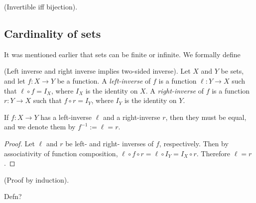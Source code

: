 \begin{theorem}
\label{ch::logic_pf_fns::thm::invertible_iff_bijection}
    (Invertible iff bijection).
\end{theorem}

\subsection*{Cardinality of sets}

It was mentioned earlier that sets can be finite or infinite. We formally define

\begin{theorem}
    (Left inverse and right inverse implies two-sided inverse). Let $X$ and $Y$ be sets, and let $f:X \rightarrow Y$ be a function. A \textit{left-inverse} of $f$ is a function $\ell:Y \rightarrow X$ such that $\ell \circ f = I_X$, where $I_X$ is the identity on $X$. A \textit{right-inverse} of $f$ is a function $r:Y \rightarrow X$ such that $f \circ r = I_Y$, where $I_Y$ is the identity on $Y$.
    
    If $f:X \rightarrow Y$ has a left-inverse $\ell$ and a right-inverse $r$, then they must be equal, and we denote them by $f^{-1} := \ell = r$.
\end{theorem}

\begin{proof}
    Let $\ell$ and $r$ be left- and right- inverses of $f$, respectively. Then by associativity of function composition, $\ell \circ f \circ r = \ell \circ I_Y = I_X \circ r$. Therefore $\ell = r$.
\end{proof}

\begin{defn}
    (Proof by induction).
    
    Defn?
\end{defn}
